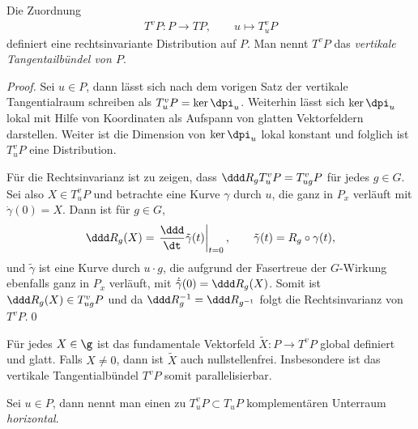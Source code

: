 \documentclass[%
	paper=a5,%
	fleqn,%
	DIV=18,%
	BCOR=0mm,
	fontsize=11pt,
	titlepage=false,%
	bibliography=totoc,
	DIV=18,%
	twoside=true,
	pdftitle=Riemannsche Geometrie,
	pdfauthor=Uwe Semmelmann,
	numbers=noendperiod]%
	{scrbook}
\begin{document}
\begin{cor}
Die Zuordnung
\begin{align*}
T^v P : P\to TP,\qquad  u \mapsto T^v_uP
\end{align*}
definiert eine rechtsinvariante Distribution auf $P$. Man nennt $T^vP$ das
\emph{vertikale Tangentailbündel von $P$}.\fish
\end{cor}
\begin{proof}
Sei $u\in P$, dann lässt sich nach dem vorigen Satz
der vertikale Tangentialraum schreiben als $T^v_uP = \ker\dpi_u$.
Weiterhin lässt sich $\ker\dpi_u$ lokal mit Hilfe von Koordinaten als
Aufspann von glatten Vektorfeldern darstellen. Weiter ist die Dimension von $\ker\dpi_u$
lokal konstant  und folglich ist $T^v_uP$ eine
Distribution.

Für die Rechtsinvarianz ist zu zeigen, dass $\ddd R_g T^v_u P = T^v_{ug}P$
für jedes $g\in G$. Sei also $X\in T^v_uP$ und betrachte eine
Kurve $\gamma$ durch $u$, die ganz in $P_x$ verläuft mit $\dot{\gamma}(0) = X$. 
Dann ist für $g\in G$,
\begin{align*}
\ddd R_g(X) = \left.\frac{\ddd}{\dt} \tilde{\gamma}(t)\right|_{t=0},\qquad
\tilde{\gamma}(t) = R_g\circ\gamma(t),
\end{align*}
und $\tilde{\gamma}$ ist eine Kurve durch $u\cdot g$, die aufgrund der
Fasertreue der $G$-Wirkung ebenfalls ganz in $P_x$ verläuft, mit
$\dot{\tilde{\gamma}}(0) = \ddd R_g(X)$. Somit ist $\ddd R_g(X) \in
T^v_{ug}P$ und da $\ddd R_g^{-1} = \ddd R_{g^{-1}}$ folgt die
Rechtsinvarianz von $T^vP$.\qed
\end{proof}

\begin{rem}
Für jedes $X\in\g$ ist das fundamentale Vektorfeld $\tilde{X}: P\to T^vP$ global
definiert und glatt. Falls $X\neq 0$, dann ist $\tilde X$ auch nullstellenfrei. Insbesondere ist das vertikale
Tangentialbündel $T^vP$ somit parallelisierbar.\map
\end{rem}


\begin{defn}
Sei $u\in P$, dann nennt man einen zu $T^v_uP\subset T_uP$ komplementären
Unterraum \emph{horizontal}.\fish
\end{defn}
\end{document}
